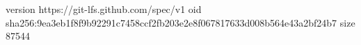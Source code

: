 version https://git-lfs.github.com/spec/v1
oid sha256:9ea3eb1f8f9b92291c7458ccf2fb203e2e8f067817633d008b564e43a2bf24b7
size 87544
